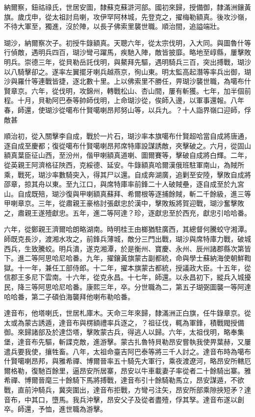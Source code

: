 \begin{pinyinscope}
納爾察，鈕祜祿氏，世居安圖，隸蘇克蘇滸河部。國初來歸，授備御，隸滿洲鑲黃旗。歲戊申，從太祖討烏喇，攻伊罕阿林城，先登克之，擢梅勒額真。後攻沙嶺，不待大軍至，獨進，沒於陣，以長子佛索里襲世職。順治間，追謚端壯。

瑚沙，納爾察次子。初授牛錄額真。天聰六年，從太宗伐明，入大同。與圖魯什等行偵敵，遇明兵四百，瑚沙彎弓躍馬，疾馳入陣，敵皆披靡。略地至崞縣，屢擊敗明兵。崇德三年，從貝勒岳託伐明，與鰲拜先驅，遇明騎兵三百，突出搏戰，瑚沙以八騎擊卻之。遂率左翼擺牙喇兵越燕京，徇山東。明太監高起潛等率兵出御，瑚沙與羅什等連戰皆捷，逐北數十里。上以佛索里不勝任，畀瑚沙襲世職，為噶布什賢章京。六年，從伐明，攻錦州，轉戰松山、杏山間，屢有斬獲。七年，加半個前程。十月，貝勒阿巴泰等帥師伐明，上命瑚沙從，俟師入邊，以軍事還報。八年春，師還，使瑚沙從噶布什賢噶喇昂邦努山等，以兵九。？十人詣界嶺口迎師，俘敵甚

順治初，從入關擊李自成，戰於一片石，瑚沙率本旗噶布什賢超哈當自成將唐通，逐自成至慶都；復從噶布什賢噶喇昂邦席特庫設謀誘敵，夾擊破之。六月，從固山額真葉臣征山西，至汾州，偕甲喇額真道喇、圖爾賽等，擊破自成將白輝。二年，從英親王阿濟格征陜西，克綏德、延安。牛錄額真哈爾漢俄班駐軍南山，為賊所乘，戰死，瑚沙率數騎突入，得其尸以還。自成奔湖廣，追剿至安陸，擊敗自成將邵章，掠其舟以東。至九江口，與席特庫率前鋒二十人破賊壘，逐自成至於九宮山。自成既殕，瑚沙復與甲喇額真蘇拜、希爾根等逐捕餘賊，斬二千餘級，進三等甲喇章京。三年，從肅親王豪格討張獻忠於漢中，擊敗叛將賀迎戰，瑚沙奮擊敗之，肅親王遂殪獻忠。五年，進二等阿達？珍，逐獻忠至於西充，獻忠引哈哈番。

六年，從鄭親王濟爾哈朗略湖南。時明桂王由榔猶駐廣西，其總督何騰蛟守湘潭。師既克長沙，渡湘水攻之，前鋒兵薄城，敵分三門出戰，瑚沙與席特庫力戰，破城西兵，生致騰蛟。明兵潰，遂克湘潭，於是衡州、寶慶、永州、辰州諸郡縣次第皆下。進二等阿思哈尼哈番。九年，擢鑲黃旗蒙古副都統，命與學士蘇納海使朝鮮鞫獄。十一年，兼任工部侍郎。十二年，擢本旗蒙古都統，授議政大臣。十五年，從信郡王多尼下雲南。十六年，從克永昌。十七年，師還。以永昌初下，縱兵入城擾民，降三等阿思哈尼哈番。康熙三年，卒。分世職為二，第五子瑚弼圖襲一等阿達哈哈番，第二子碩伯海襲拜他喇布勒哈番。

達音布，他塔喇氏，世居札庫木。天命三年來歸，隸滿洲正白旗，任牛錄章京。從太或為蒙古誘遁，達音布與楞額禮率兵逐之，？祖征伐，輒為軍鋒，積戰閥授備御。來歸諸部及於達岱塔，擊敗蒙古兵，得逃人以歸。六年，太祖伐明，略奉集堡，達音布先驅，斬諜克敵，進游擊。蒙古扎魯特貝勒昂安嘗執我使畀葉赫，又屢遣兵要我使，攘牲畜。八年，太祖命臺吉阿巴泰等將三千人討之。達音布時為噶布什賢噶喇昂邦，與雅希禪、博爾晉率五十騎先大軍行，乘夜渡遼河，略昂安所轄厄爾格勒，復馳百餘里，逼昂安所居寨，昂安以牛車載妻子率從者二十餘騎出寨。雅希禪、博爾晉麾三十餘騎下馬將搏戰，達音布引十餘騎勒馬立，昂安謀遁，不欲戰，直前沖騎兵，冀突圍出，達音布拒戰，方彎弓注矢，昂安所部乘隙挾短矛？達音布，中其口，墮馬。我兵沖擊，昂安父子及從者盡殪，俘其孥。達音布遂以創卒。師還，予恤，進世職為游擊。


\end{pinyinscope}
